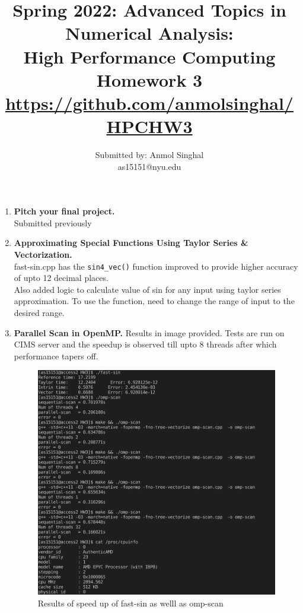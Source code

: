 \documentclass[12pt]{article}
\title{Spring 2022: Advanced Topics in Numerical Analysis: \\
High Performance Computing\\Homework 3 \\ \hyperref[Github]{https://github.com/anmolsinghal/HPCHW3}}
\author{Submitted by: Anmol Singhal \\ as15151@nyu.edu}
\date{}
\begin{document}
\maketitle
\begin{enumerate}
\item {\bf Pitch your final project.} \\
  Submitted previously

  \item {\bf Approximating Special Functions Using Taylor Series \& Vectorization.} \\
  fast-sin.cpp has the \texttt{sin4\_vec()} function improved to provide higher accuracy of upto 12 decimal places. \\
  Also added logic to calculate value of sin for any input using taylor series approximation. To use the function, need to change the range of input to the desired range.
   
  \item {\bf Parallel Scan in OpenMP.} 
  Results in image provided. Tests are run on CIMS server and the speedup is observed till upto 8 threads after which performance tapers off.

  \begin{figure}[H]
    \caption{Results of speed up of fast-sin as welll as omp-scan}
    \centering
    \includegraphics[width=\textwidth]{results.png}
    \end{figure}
\end{enumerate}
\end{document}
